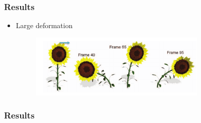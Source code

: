 \documentclass[serif,mathserif, 12pt]{beamer}
\begin{document}
\begin{frame}
  \frametitle{Results}
  \begin{itemize}
  \item Large deformation
    \begin{figure}
      \centering
      \includegraphics[width=0.8\textwidth]{img/sunflower_large_def}
    \end{figure}
  \end{itemize}
\end{frame}

\begin{frame}
  \frametitle{Results}
\end{frame}

\begin{frame} 
\end{frame}
\end{document}
